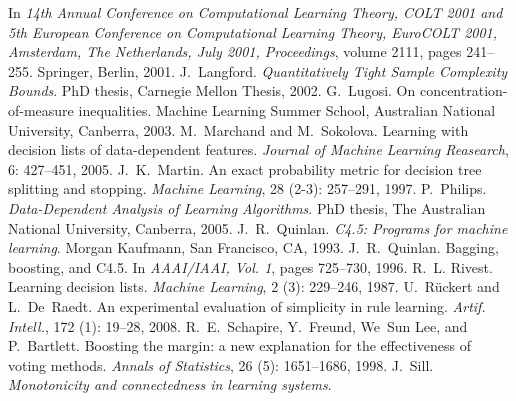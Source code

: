 \documentclass{article}
\renewcommand{\emph}[1]{\textit{#1}}
\begin{document}
\begin{thebibliography}{27}
    \newblock In \emph{14th Annual Conference on Computational Learning Theory,
      {COLT} 2001 and 5th {E}uropean Conference on Computational Learning Theory,
      {EuroCOLT} 2001, Amsterdam, The Netherlands, July 2001, Proceedings}, volume 2111, pages 241--255.
      Springer, Berlin, 2001.
    J.~Langford.
    \newblock \emph{Quantitatively Tight Sample Complexity Bounds}.
    \newblock PhD thesis, Carnegie Mellon Thesis, 2002.
    G.~Lugosi.
    \newblock On concentration-of-measure inequalities.
    \newblock Machine Learning Summer School, Australian National University, Canberra, 2003.
    M.~Marchand and M.~Sokolova.
    \newblock Learning with decision lists of data-dependent features.
    \newblock \emph{Journal of Machine Learning Reasearch}, 6: 427--451, 2005.
    J.~K.~Martin.
    \newblock An exact probability metric for decision tree splitting and stopping.
    \newblock \emph{Machine Learning}, 28 (2-3): 257--291, 1997.
    P.~Philips.
    \newblock \emph{Data-Dependent Analysis of Learning Algorithms}.
    \newblock PhD thesis, The Australian National University, Canberra, 2005.
    J.~R.~Quinlan.
    \newblock \emph{C4.5: Programs for machine learning}.
    \newblock Morgan Kaufmann, San Francisco, CA, 1993.
    J.~R.~Quinlan.
    \newblock Bagging, boosting, and {C4.5}.
    \newblock In \emph{{AAAI}/{IAAI}, Vol. 1}, pages 725--730, 1996.
    R.~L. Rivest.
    \newblock Learning decision lists.
    \newblock \emph{Machine Learning}, 2 (3): 229--246, 1987.
    U.~R\"uckert and L.~De~Raedt.
    \newblock An experimental evaluation of simplicity in rule learning.
    \newblock \emph{Artif. Intell.}, 172 (1): 19--28, 2008.
    R.~E.~Schapire, Y.~Freund, We~Sun Lee, and P.~Bartlett.
    \newblock Boosting the margin: a new explanation for the effectiveness of  voting methods.
    \newblock \emph{Annals of Statistics}, 26 (5): 1651--1686, 1998.
    J.~Sill.
    \newblock \emph{Monotonicity and connectedness in learning systems}.

\end{thebibliography}
\end{document}

